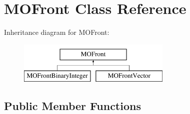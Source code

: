 \hypertarget{classMOFront}{}\section{M\+O\+Front Class Reference}
\label{classMOFront}
Inheritance diagram for M\+O\+Front\+:\begin{figure}[H]
\begin{center}
\leavevmode
\includegraphics[height=2.000000cm]{d6/d3e/classMOFront}
\end{center}
\end{figure}
\subsection*{Public Member Functions}
